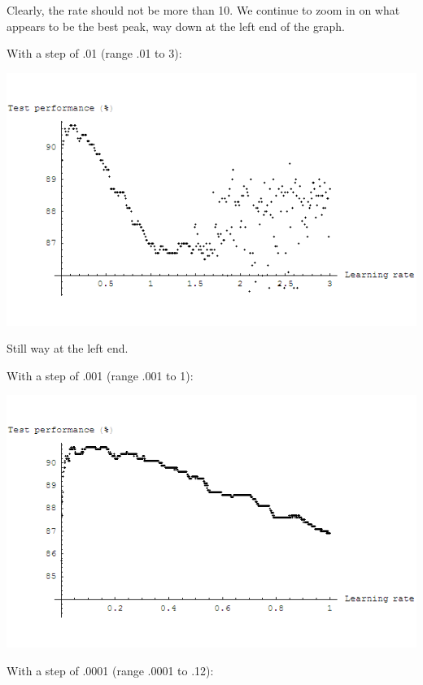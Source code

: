 \documentclass{article}
\begin{document}
\begin{enumerate}
\begin{enumerate}
      Clearly, the rate should not be more than 10. We continue to
      zoom in on what appears to be the best peak, way down at the
      left end of the graph.

      With a step of .01 (range .01 to 3):

      \begin{center}
        \includegraphics[scale=.5]{plot_test_01.png}
      \end{center}

      Still way at the left end.

      With a step of .001 (range .001 to 1):

      \begin{center}
        \includegraphics[scale=.5]{plot_test_001.png}
      \end{center}

      With a step of .0001 (range .0001 to .12):


\end{enumerate}
\end{enumerate}
\end{document}
